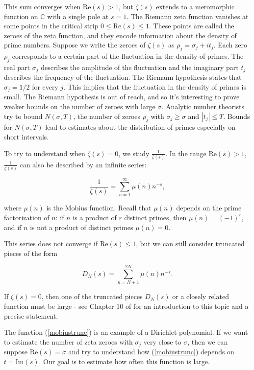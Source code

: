\documentclass{amsart}
\newcommand{\CC}{\mathbb{C}}
\newcommand{\Reb}{\textrm{Re}}
\newcommand{\Imb}{\textrm{Im}}
\begin{document}
\noindent This sum converges when $\Reb(s) > 1$,  but $\zeta(s)$ extends to a meromorphic function on $\CC$ with a single pole at $s=1$.   The Riemann zeta function vanishes at some points in the critical strip $0 \le \Reb(s) \le 1$.   These points are called the zeroes of the zeta function,  and they encode information about the density of prime numbers.   Suppose we write the zeroes of $\zeta(s)$ as $\rho_j = \sigma_j + i t_j$.    Each zero $\rho_j$ corresponds to a certain part of the fluctuation in the density of primes.   The real part $\sigma_j$ describes the amplitude of the fluctuation and the imaginary part $t_j$ describes the frequency of the fluctuation.   The Riemann hypothesis states that $\sigma_j = 1/2$ for every $j$.   This implies that the fluctuation in the density of primes is small.   The Riemann hypothesis is out of reach,  and so it's interesting to prove weaker bounds on the number of zeroes with large $\sigma$.   Analytic number theorists try to bound $N(\sigma, T)$,  the number of zeroes $\rho_j$ with $\sigma_j \ge \sigma$ and $|t_j| \le T$.   Bounds for $N(\sigma, T)$ lead to estimates about the distribution of primes especially on short intervals.

To try to understand when $\zeta(s) = 0$,  we study $\frac{1}{\zeta(s)}$.   In the range $\Reb(s) > 1$,  $\frac{1}{\zeta(s)}$ can also be described by an infinite series:

\begin{equation} \label{mobius} \frac{1}{\zeta(s)} = \sum_{n=1}^\infty \mu(n) n^{-s},  \end{equation}

\noindent where $\mu(n)$ is the Mobius function.   Recall that $\mu(n)$ depends on the prime factorization of $n$: if $n$ is a product of $r$ distinct primes,  then $\mu(n) = (-1)^r$,  and if $n$ is not a product of distinct primes $\mu(n) = 0$.

This series does not converge if $\Reb(s) \le 1$,  but we can still consider truncated pieces of the form 

\begin{equation} \label{mobiustrunc}
D_N(s) = \sum_{n=N+1}^{2N} \mu(n) n^{-s}.
\end{equation}


\noindent If $\zeta(s) = 0$,  then one of the truncated pieces $D_N(s)$ or a closely related function must be large - see Chapter 10 of \cite{IK} for an introduction to this topic and a precise statement.

The function  (\ref{mobiustrunc}) is an example of a Dirichlet polynomial.   If we want to estimate the number of zeta zeroes with $\sigma_j$ very close to $\sigma$,  then we can suppose $\Reb(s) = \sigma$ and try to understand how (\ref{mobiustrunc}) depends  on $t = \Imb(s)$.    Our goal is to estimate how often this function is large.
\end{document}
